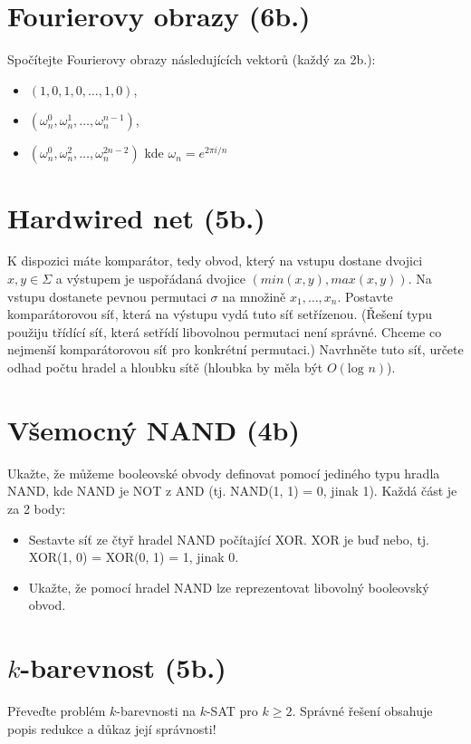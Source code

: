 \documentclass{scrartcl}
\begin{document}
\section{Fourierovy obrazy (6b.)}
Spočítejte Fourierovy obrazy následujících vektorů (každý za 2b.):
\begin{itemize}
    \item $( 1,0,1,0 , \dots , 1,0 )$,
    \item $\left( \omega _ { n } ^ { 0 } , \omega _ { n } ^ { 1 } , \ldots , \omega _ { n } ^ { n - 1 } \right)$,
    \item $\left( \omega _ { n } ^ { 0 } , \omega _ { n } ^ { 2 } , \ldots , \omega _ { n } ^ { 2 n - 2 } \right)$ kde $\omega _ { n } = e ^ { 2 \pi i / n }$
\end{itemize}

\section{Hardwired net (5b.)}
K dispozici máte komparátor, tedy obvod, který na vstupu dostane dvojici $x,y \in \Sigma$ a výstupem je uspořádaná dvojice $(min(x,y),max(x,y))$. Na vstupu dostanete pevnou permutaci $\sigma$ na množině $x_1, \dots , x_n$. Postavte komparátorovou síť, která na výstupu vydá tuto síť setřízenou. (Řešení typu použiju třídící síť, která setřídí libovolnou permutaci není správné. Chceme co nejmenší komparátorovou síť pro konkrétní permutaci.) Navrhněte tuto síť, určete odhad počtu hradel a hloubku sítě (hloubka by měla být $O(\text{log }n)$).

\section{Všemocný NAND (4b)}
Ukažte, že můžeme booleovské obvody definovat pomocí jediného typu hradla NAND, kde NAND je NOT z AND (tj. NAND(1, 1) = 0, jinak 1). Každá část je za 2 body: 
\begin{itemize}
    \item Sestavte síť ze čtyř hradel NAND počítající XOR. XOR je buď nebo, tj. XOR(1, 0) = XOR(0, 1) = 1, jinak 0.
    \item Ukažte, že pomocí hradel NAND lze reprezentovat libovolný booleovský obvod.
\end{itemize}

\section{$k$-barevnost (5b.)}
Převeďte problém $k$-barevnosti na $k$-SAT pro $k \geq 2$. Správné řešení obsahuje popis redukce a důkaz její správnosti!
\end{document}
